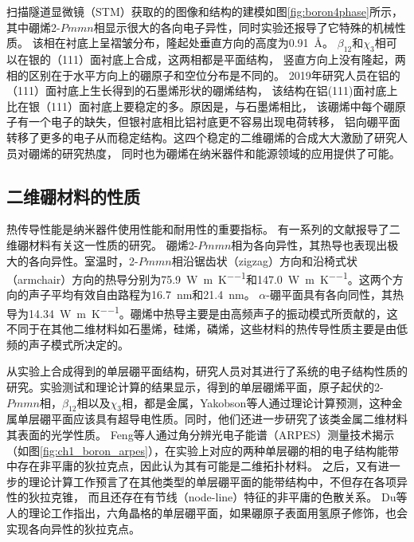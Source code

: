 扫描隧道显微镜（STM）获取的的图像和结构的建模如图\ref{fig:boron4phase}所示，
其中硼烯2-$Pmmn$相显示很大的各向电子异性，同时实验还报导了它特殊的机械性质。
该相在衬底上呈褶皱分布，隆起处垂直方向的高度为\SI{0.91}{\angstrom}。
$\beta_{12}$和$\chi_3$相可以在银的（111）面衬底上合成，这两相都是平面结构，
竖直方向上没有隆起，两相的区别在于水平方向上的硼原子和空位分布是不同的。
2019年研究人员在铝的（111）面衬底上生长得到的石墨烯形状的硼烯结构\cite{li2018experimental}，
该结构在铝(111)面衬底上比在银（111）面衬底上要稳定的多。原因是，与石墨烯相比，
该硼烯中每个硼原子有一个电子的缺失，但银衬底相比铝衬底更不容易出现电荷转移，
铝向硼平面转移了更多的电子从而稳定结构。这四个稳定的二维硼烯的合成大大激励了研究人员对硼烯的研究热度，
同时也为硼烯在纳米器件和能源领域的应用提供了可能。


\subsection{二维硼材料的性质}
热传导性能是纳米器件使用性能和耐用性的重要指标。
有一系列的文献\cite{li2018stretch, mortazavi2018borophene, zhou2017superior, liu2017anisotropic, sun2016first, mortazavi2017anomalous}报导了二维硼材料有关这一性质的研究。
硼烯2-$Pmmn$相为各向异性，其热导也表现出极大的各向异性。室温时，2-$Pmmn$相沿锯齿状（zigzag）方向和沿椅式状（armchair）方向的热导分别为\SI{75.9}{\W\per\meter\per\kelvin}和\SI{147.0}{\W\per\meter\per\kelvin}。这两个方向的声子平均有效自由路程为\SI{16.7}{\nm}和\SI{21.4}{\nm}。
$\alpha$-硼平面具有各向同性，其热导为\SI{14.34}{\W\per\meter\per\kelvin}。硼烯中热导主要是由高频声子的振动模式所贡献的，这不同于在其他二维材料如石墨烯，硅烯，磷烯，这些材料的热传导性质主要是由低频的声子模式所决定的\cite{gu2015first,qin2015anisotropic}。

从实验上合成得到的单层硼平面结构，研究人员对其进行了系统的电子结构性质的研究。实验测试和理论计算的结果显示，得到的单层硼烯平面，原子起伏的2-$Pmmn$相，$\beta_{12}$相以及$\chi_3$相，都是金属\cite{shu2016unveiling}，Yakobson等人\cite{penev2016can}通过理论计算预测，这种金属单层硼平面应该具有超导电性质。同时，他们还进一步研究了该类金属二维材料其表面的光学性质\cite{huang2017two}。
Feng等人\cite{feng2017dirac,feng2018discovery}通过角分辨光电子能谱（ARPES）测量技术揭示（如图\ref{fig:ch1_boron_arpes}），在实验上对应的两种单层硼的相的电子结构能带中存在非平庸的狄拉克点，因此认为其有可能是二维拓扑材料。
之后，又有进一步的理论计算工作预言了在其他类型的单层硼平面的能带结构中，不但存在各项异性的狄拉克锥， 而且还存在有节线（node-line）特征的非平庸的色散关系\cite{zhang2017dirac}。
Du等人\cite{jiao2016two}的理论工作指出，六角晶格的单层硼平面，如果硼原子表面用氢原子修饰，也会实现各向异性的狄拉克点。

